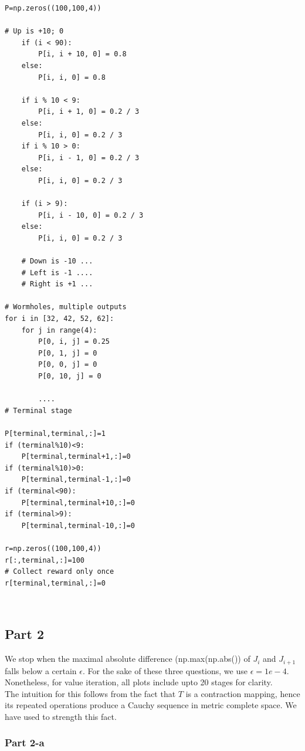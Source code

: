 \begin{lstlisting}
P=np.zeros((100,100,4))

# Up is +10; 0
    if (i < 90):
        P[i, i + 10, 0] = 0.8
    else:
        P[i, i, 0] = 0.8

    if i % 10 < 9:
        P[i, i + 1, 0] = 0.2 / 3
    else:
        P[i, i, 0] = 0.2 / 3
    if i % 10 > 0:
        P[i, i - 1, 0] = 0.2 / 3
    else:
        P[i, i, 0] = 0.2 / 3

    if (i > 9):
        P[i, i - 10, 0] = 0.2 / 3
    else:
        P[i, i, 0] = 0.2 / 3
        
    # Down is -10 ...
    # Left is -1 ....
    # Right is +1 ...
    
# Wormholes, multiple outputs
for i in [32, 42, 52, 62]:
    for j in range(4):
        P[0, i, j] = 0.25
        P[0, 1, j] = 0
        P[0, 0, j] = 0
        P[0, 10, j] = 0
        
        ....
# Terminal stage

P[terminal,terminal,:]=1
if (terminal%10)<9:
    P[terminal,terminal+1,:]=0
if (terminal%10)>0:
    P[terminal,terminal-1,:]=0
if (terminal<90):
    P[terminal,terminal+10,:]=0
if (terminal>9):
    P[terminal,terminal-10,:]=0

r=np.zeros((100,100,4))
r[:,terminal,:]=100
# Collect reward only once
r[terminal,terminal,:]=0
\end{lstlisting}\\

\subsection{Part 2}

We stop when the maximal absolute difference (np.max(np.abs()) of $J_i$ and $J_{i+1}$ falls below a certain $\epsilon$. For the sake of these three questions, we use $\epsilon = 1e-4$. \\

Nonetheless, for value iteration, all plots include upto 20 stages for clarity. \\

The intuition for this follows from the fact that $T$ is a contraction mapping, hence its repeated operations produce a Cauchy sequence in metric complete space. We have used to strength this fact. \\

\subsubsection{Part 2-a}

